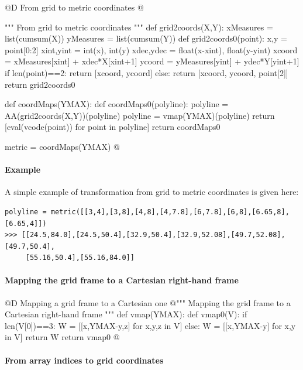 \documentclass[11pt,oneside]{article}    %
\begin{document}
@D From grid to metric coordinates
@{""" From grid to metric coordinates """
def grid2coords(X,Y):
    xMeasures = list(cumsum(X))
    yMeasures = list(cumsum(Y))
    def grid2coords0(point):
        x,y = point[0:2]
        xint,yint = int(x), int(y)
        xdec,ydec = float(x-xint), float(y-yint)
        xcoord = xMeasures[xint] + xdec*X[xint+1]
        ycoord = yMeasures[yint] + ydec*Y[yint+1]
        if len(point)==2: return [xcoord, ycoord]
        else: return [xcoord, ycoord, point[2]]
    return grid2coords0

def coordMaps(YMAX):
    def coordMaps0(polyline):
        polyline = AA(grid2coords(X,Y))(polyline)
        polyline = vmap(YMAX)(polyline)
        return [eval(vcode(point)) for point in polyline]
    return coordMaps0

metric = coordMaps(YMAX)
@}


\paragraph{Example} 
A simple example of transformation from grid to metric coordinates is given here:
{\small 
\begin{verbatim}
polyline = metric([[3,4],[3,8],[4,8],[4,7.8],[6,7.8],[6,8],[6.65,8],[6.65,4]])
>>> [[24.5,84.0],[24.5,50.4],[32.9,50.4],[32.9,52.08],[49.7,52.08],[49.7,50.4],
     [55.16,50.4],[55.16,84.0]]
\end{verbatim}}


\paragraph{Mapping the grid frame to a Cartesian right-hand frame}
@D Mapping a grid frame to a Cartesian one
@{""" Mapping the grid frame to a Cartesian right-hand frame """
def vmap(YMAX):
    def vmap0(V):
        if len(V[0])==3: W = [[x,YMAX-y,z] for x,y,z in V]
        else: W = [[x,YMAX-y] for x,y in V]
        return W
    return vmap0
@}


\paragraph{From array indices to grid coordinates}
\end{document}
